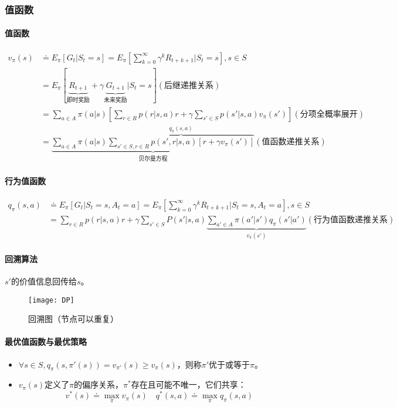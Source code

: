 \documentclass[
12pt, %
a4paper, 
oneside, %
headinclude,footinclude, %
]{scrartcl}
\begin{document}
\subsubsection[值函数]{值函数}
\paragraph{值函数}
\begin{align*}
v_\pi(s) &\doteq E_\pi[G_t|S_t = s] = E_\pi[\sum_{k = 0}^{\infty} \gamma^k R_{t + k + 1}|S_t = s], s \in S \\
&= E_\pi[\underbrace{R_{t + 1}}_{\text{即时奖励}} + \gamma \underbrace{G_{t + 1}}_{\text{未来奖励}}|S_t = s] (\text{后继递推关系}) \\
&= \sum_{a \in A} \pi(a|s)[\sum_{r \in R} p(r|s, a)r + \gamma \sum_{s' \in S} p(s'|s, a)v_{\pi}(s')] (\text{分项全概率展开}) \\
&= \underbrace{\sum_{a \in A} \pi(a|s) \overbrace{\sum_{s' \in S, r \in R} p(s', r|s, a)[r + \gamma v_\pi(s')]}^{q_{\pi}(s, a)}}_{\text{贝尔曼方程}} (\text{值函数递推关系})
\end{align*}
\paragraph{行为值函数}
\begin{align*} 
q_\pi(s, a) &\doteq E_\pi[G_t|S_t = s, A_t = a] = E_\pi[\sum_{k = 0}^{\infty} \gamma^k R_{t + k + 1}|S_t = s, A_t = a], s \in S \\
&= \sum_{r \in R} p(r|s, a)r + \gamma \sum_{s' \in S} P(s'|s, a) \underbrace{\sum_{a' \in A} \pi(a'|s')q_{\pi}(s'|a')}_{v_{\pi}(s')} (\text{行为值函数递推关系})
\end{align*}
\paragraph{回溯算法}
$ s' $的价值信息回传给$ s $。

\begin{figure}[H]
\centering 
\texttt{[image: DP]} 
\caption[回溯图]{回溯图（节点可以重复）}
\end{figure}
\paragraph{最优值函数与最优策略}
\begin{itemize}
\item $ \forall s \in S, q_{\pi}(s, \pi'(s)) = v_{\pi'}(s) \geq v_{\pi}(s) $，则称$ \pi' $优于或等于$ \pi $。
\item $ v_\pi(s) $定义了$ \pi $的偏序关系，$ \pi^* $存在且可能不唯一，它们共享：
$$ v^*(s) \doteq \max_{\pi} v_{\pi}(s) \quad q^*(s, a) \doteq \max_{\pi} q_{\pi}(s, a) $$
\end{itemize}
\end{document}
